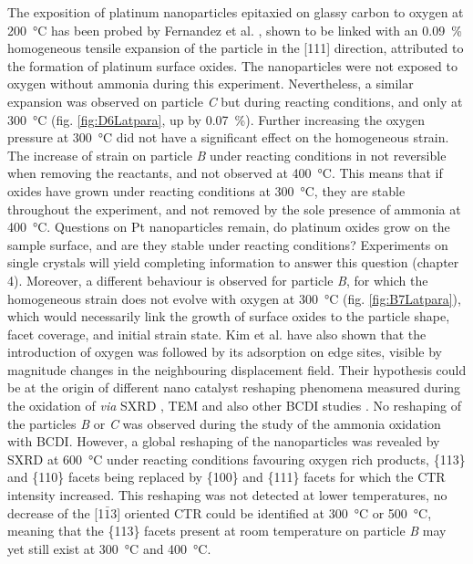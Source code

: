 The exposition of platinum nanoparticles epitaxied on glassy carbon to oxygen at \qty{200}{\degreeCelsius} has been probed by Fernandez et al. \parencite*{Fernandez2019}, shown to be linked with an \qty{0.09}{\percent} homogeneous tensile expansion of the particle in the [111] direction, attributed to the formation of platinum surface oxides.
The nanoparticles were not exposed to oxygen without ammonia during this experiment.
Nevertheless, a similar expansion was observed on particle \textit{C} but during reacting conditions, and only at \qty{300}{\degreeCelsius} (fig. \ref{fig:D6Latpara}, up by \qty{0.07}{\percent}).
Further increasing the oxygen pressure at \qty{300}{\degreeCelsius} did not have a significant effect on the homogeneous strain.
The increase of strain on particle \textit{B} under reacting conditions in not reversible when removing the reactants, and not observed at \qty{400}{\degreeCelsius}.
This means that if oxides have grown under reacting conditions at \qty{300}{\degreeCelsius}, they are stable throughout the experiment, and not removed by the sole presence of ammonia at \qty{400}{\degreeCelsius}.
Questions on Pt nanoparticles remain, do platinum oxides grow on the sample surface, and are they stable under reacting conditions?
Experiments on single crystals will yield completing information to answer this question (chapter 4).
Moreover, a different behaviour is observed for particle \textit{B}, for which the homogeneous strain does not evolve with oxygen at \qty{300}{\degreeCelsius} (fig. \ref{fig:B7Latpara}), which would necessarily link the growth of surface oxides to the particle shape, facet coverage, and initial strain state.
Kim et al. \parencite*{Kim2018} have also shown that the introduction of oxygen was followed by its adsorption on edge sites, visible by magnitude changes in the neighbouring displacement field.
Their hypothesis could be at the origin of different nano catalyst reshaping phenomena measured during the oxidation of  \textit{via} SXRD \parencite{Nolte2008, Hejral2016}, TEM \parencite{Vendelbo2014} and also other BCDI studies \parencite{Abuin2019}.
No reshaping of the particles \textit{B} or \textit{C} was observed during the study of the ammonia oxidation with BCDI.
However, a global reshaping of the nanoparticles was revealed by SXRD at \qty{600}{\degreeCelsius} under reacting conditions favouring oxygen rich products, \{113\} and \{110\} facets being replaced by \{100\} and \{111\} facets for which the CTR intensity increased.
This reshaping was not detected at lower temperatures, no decrease of the [1$\bar{1}$3] oriented CTR could be identified at \qty{300}{\degreeCelsius} or \qty{500}{\degreeCelsius}, meaning that the \{113\} facets present at room temperature on particle \textit{B} may yet still exist at \qty{300}{\degreeCelsius} and \qty{400}{\degreeCelsius}.
